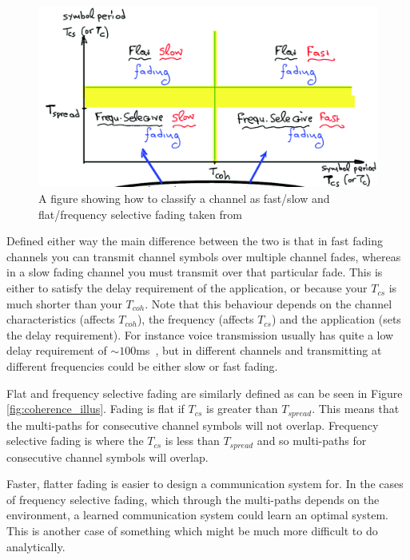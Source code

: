 \documentclass[12pt,onecolumn,letterpaper]{article}
\newcommand\genfigsize{0.5}
\begin{document}
\begin{figure}[t]
   \centering
   \includegraphics[width=\genfigsize\linewidth]{figures/fast_slow_flat_freq_selec_fading.PNG}
   \caption{A figure showing how to classify a channel as fast/slow and flat/frequency selective fading taken from~\cite{EE3CommsSystemsNotesL4}}
\label{fig:fast_slow_flat_freq_selec_fading}
\end{figure}

Defined either way the main difference between the two is that in fast fading channels you can transmit channel symbols over multiple channel fades, whereas in a slow fading channel you must transmit over that particular fade. This is either to satisfy the delay requirement of the application, or because your $T_{cs}$ is much shorter than your $T_{coh}$. Note that this behaviour depends on the channel characteristics (affects $T_{coh}$), the frequency (affects $T_{cs}$) and the application (sets the delay requirement). For instance voice transmission usually has quite a low delay requirement of ${\sim}100$ms~\cite{WirelessTextbookC2}, but in different channels and transmitting at different frequencies could be either slow or fast fading.

Flat and frequency selective fading are similarly defined as can be seen in Figure \ref{fig:coherence_illus}. Fading is flat if $T_{cs}$ is greater than $T_{spread}$. This means that the multi-paths for consecutive channel symbols will not overlap. Frequency selective fading is where the $T_{cs}$ is less than $T_{spread}$ and so multi-paths for consecutive channel symbols will overlap.

Faster, flatter fading is easier to design a communication system for. In the cases of frequency selective fading, which through the multi-paths depends on the environment, a learned communication system could learn an optimal system. This is another case of something which might be much more difficult to do analytically.
\end{document}

